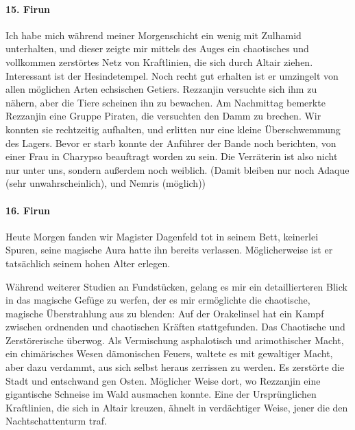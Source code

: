\paragraph{15. Firun}
Ich habe mich während meiner Morgenschicht ein wenig mit Zulhamid unterhalten, und dieser zeigte mir mittels des Auges ein chaotisches und vollkommen zerstörtes Netz von Kraftlinien, die sich durch Altair ziehen.
Interessant ist der Hesindetempel. Noch recht gut erhalten ist er umzingelt von allen möglichen Arten echsischen Getiers. Rezzanjin versuchte sich ihm zu nähern, aber die Tiere scheinen ihn zu bewachen.
Am Nachmittag bemerkte Rezzanjin eine Gruppe Piraten, die versuchten den Damm zu brechen. Wir konnten sie rechtzeitig aufhalten, und erlitten nur eine kleine Überschwemmung des Lagers. Bevor er starb konnte der Anführer der Bande noch berichten, von einer Frau in Charypso beauftragt worden zu sein. Die Verräterin ist also nicht nur unter uns, sondern außerdem noch weiblich. (Damit bleiben nur noch Adaque (sehr unwahrscheinlich), und Nemris (möglich))

\paragraph{16. Firun}
Heute Morgen fanden wir Magister Dagenfeld tot in seinem Bett, keinerlei Spuren, seine magische Aura hatte ihn bereits verlassen. Möglicherweise ist er tatsächlich seinem hohen Alter erlegen.

Während weiterer Studien an Fundstücken, gelang es mir ein detaillierteren Blick in das magische Gefüge zu werfen, der es mir ermöglichte die chaotische, magische Überstrahlung aus zu blenden: Auf der Orakelinsel hat ein Kampf zwischen ordnenden und chaotischen Kräften stattgefunden. Das Chaotische und Zerstörerische überwog. Als Vermischung asphalotisch und arimothischer Macht, ein chimärisches Wesen dämonischen Feuers, waltete es mit gewaltiger Macht, aber dazu verdammt, aus sich selbst heraus zerrissen zu werden. Es zerstörte die Stadt und entschwand gen Osten. Möglicher Weise dort, wo Rezzanjin eine gigantische Schneise im Wald ausmachen konnte. Eine der Ursprünglichen Kraftlinien, die sich in Altair kreuzen, ähnelt in verdächtiger Weise, jener die den Nachtschattenturm traf.


